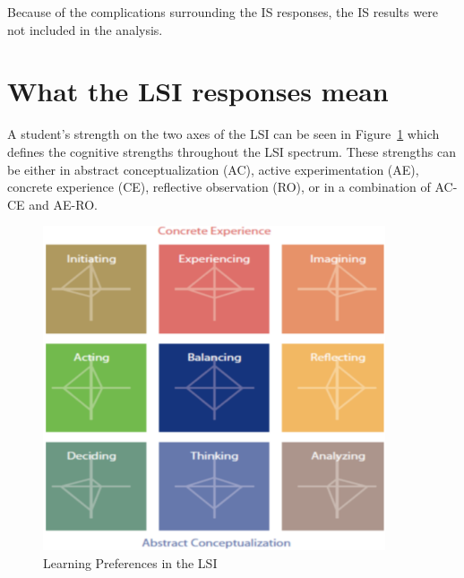 Because of the complications surrounding the IS responses, the IS results were not included in the analysis.

\section{What the LSI responses mean}
A student's strength on the two axes of the LSI can be seen in Figure~\ref{fig:learning-preferences} which defines the cognitive strengths throughout the LSI spectrum. These strengths can be either in abstract conceptualization (AC), active experimentation (AE), concrete experience (CE), reflective observation (RO), or in a combination of AC-CE and AE-RO.

\begin{figure}
  \centering
  \includegraphics[width=0.9\textwidth]{figures/chapter4/learning-preferences.png}
  \caption[Learning preferences]{Learning Preferences in the LSI}
  \label{fig:learning-preferences}
\end{figure}

